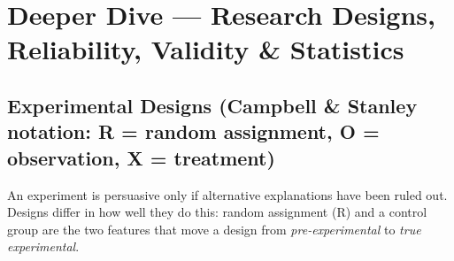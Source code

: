 \needspace{196pt}

\hypertarget{p1-02--9-deeper-dive--research-designs-reliability-validity--statistics}{%
\section{Deeper Dive --- Research Designs, Reliability, Validity \& Statistics}\label{p1-02--9-deeper-dive--research-designs-reliability-validity--statistics}}

\needspace{160pt}

\hypertarget{p1-02--91-experimental-designs-campbell--stanley-notation-r--random-assignment-o--observation-x--treatment}{%
\subsection{Experimental Designs (Campbell \& Stanley notation: R = random assignment, O = observation, X = treatment)}\label{p1-02--91-experimental-designs-campbell--stanley-notation-r--random-assignment-o--observation-x--treatment}}

An experiment is persuasive only if alternative explanations have been ruled out. Designs differ in how
well they do this: random assignment (R) and a control group are the two features that move a design from
\emph{pre-experimental} to \emph{true experimental}.

\begingroup\small

